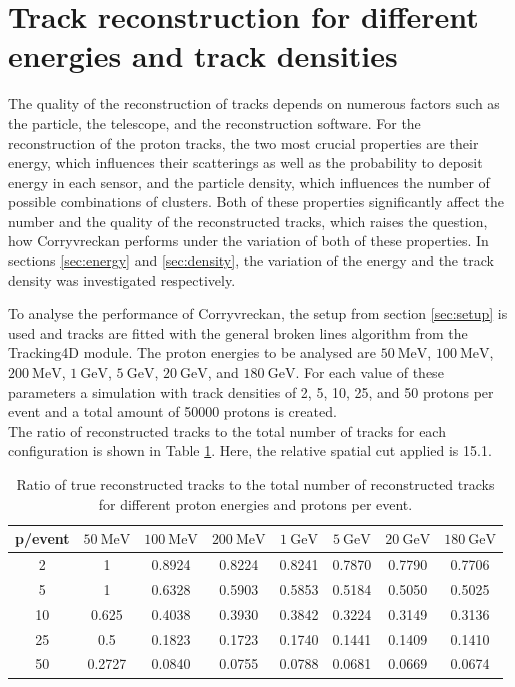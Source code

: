 \section{Track reconstruction for different energies and track densities}
The quality of the reconstruction of tracks depends on numerous factors such as the particle, the telescope, and the reconstruction software.
For the reconstruction of the proton tracks, the two most crucial properties are their energy, which influences their scatterings as well as the probability to deposit
energy in each sensor, and the particle density, which influences the number of possible combinations of clusters.
Both of these properties significantly affect the number and the quality of the reconstructed tracks, which raises the question, how Corryvreckan performs
under the variation of both of these properties.
In sections \ref{sec:energy} and \ref{sec:density}, the variation of the energy and the track density was investigated respectively.

To analyse the performance of Corryvreckan, the setup from section \ref{sec:setup} is used and tracks are fitted with the general broken lines algorithm
from the Tracking4D module.
The proton energies to be analysed are $\SI{50}{\mega\eV}$, $\SI{100}{\mega\eV}$, $\SI{200}{\mega\eV}$,
$\SI{1}{\giga\eV}$, $\SI{5}{\giga\eV}$, $\SI{20}{\giga\eV}$, and $\SI{180}{\giga\eV}$. For each value of these parameters a simulation with track densities
of 2, 5, 10, 25, and 50 protons per event and a total amount of 50000 protons is created. \\
The ratio of reconstructed tracks to the total number of tracks for each configuration is shown in Table \ref{tab:study}. Here, the relative spatial cut applied is 15.1.


\begin{table}
  \centering
  \caption{Ratio of true reconstructed tracks to the total number of reconstructed tracks for different proton energies and protons per event.}
  \begin{tabular}{c | c c c c c c c}
    \toprule
     p/event &  $\SI{50}{\mega\eV}$ & $\SI{100}{\mega\eV}$ & $\SI{200}{\mega\eV}$ & $\SI{1}{\giga\eV}$ & $\SI{5}{\giga\eV}$ & $\SI{20}{\giga\eV}$ & $\SI{180}{\giga\eV}$ \\
    \midrule
     2   & 1 & 0.8924 & 0.8224 & 0.8241 & 0.7870 & 0.7790 & 0.7706  \\
     5   & 1 & 0.6328 & 0.5903 & 0.5853 & 0.5184 & 0.5050 & 0.5025  \\
     10  & 0.625 & 0.4038 & 0.3930 & 0.3842 & 0.3224 & 0.3149 & 0.3136  \\
     25  & 0.5 & 0.1823 & 0.1723 & 0.1740 & 0.1441 & 0.1409 & 0.1410  \\
     50  & 0.2727 & 0.0840 & 0.0755 & 0.0788 & 0.0681 & 0.0669 & 0.0674  \\
  \end{tabular}
  \label{tab:study}
\end{table}

